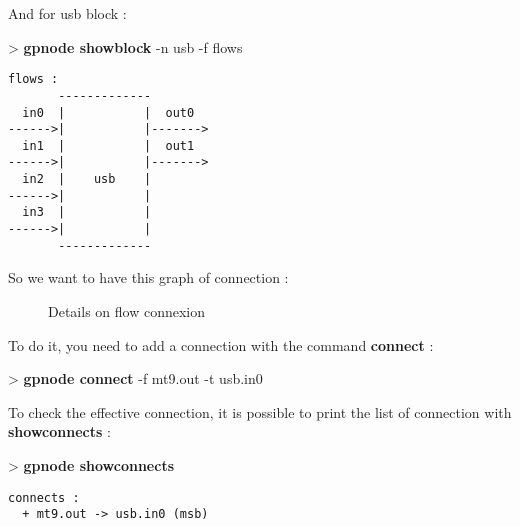\documentclass[10pt,a4paper]{article}
\begin{document}
And for usb block :

\begin{sample}
> \textbf{gpnode showblock} -n usb -f flows
\begin{Verbatim}
flows :
       -------------        
  in0  |           |  out0  
------>|           |------->
  in1  |           |  out1  
------>|           |------->
  in2  |    usb    |        
------>|           |        
  in3  |           |        
------>|           |        
       -------------
\end{Verbatim}
\end{sample}

So we want to have this graph of connection :
\begin{figure}[h!]
\centering
{}
\caption{Details on flow connexion}
\end{figure}

To do it, you need to add a connection with the command \textbf{connect} :
\begin{sample}
> \textbf{gpnode connect} -f mt9.out -t usb.in0
\end{sample}

To check the effective connection, it is possible to print the list of connection with \textbf{showconnects} :
\begin{sample}
> \textbf{gpnode showconnects}
\begin{Verbatim}
connects :
  + mt9.out -> usb.in0 (msb)
\end{Verbatim}
\end{sample}
\end{document}
